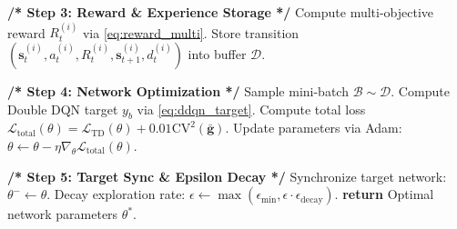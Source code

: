 \documentclass[journal]{IEEEtran}
\begin{document}
\begin{algorithm}[t]
\begin{algorithmic}[1]
        \STATE \textbf{/* Step 3: Reward \& Experience Storage */}
        \STATE Compute multi-objective reward $R_t^{(i)}$ via \eqref{eq:reward_multi}.
        \STATE Store transition $(\mathbf{s}_t^{(i)}, a_t^{(i)}, R_t^{(i)}, \mathbf{s}_{t+1}^{(i)}, d_t^{(i)})$ into buffer $\mathcal{D}$.
        
        \STATE \textbf{/* Step 4: Network Optimization */}
            \STATE Sample mini-batch $\mathcal{B} \sim \mathcal{D}$.
            \STATE Compute Double DQN target $y_b$ via \eqref{eq:ddqn_target}.
            \STATE Compute total loss $\mathcal{L}_{\text{total}}(\theta) = \mathcal{L}_{\text{TD}}(\theta) + 0.01 \text{CV}^2(\bar{\mathbf{g}})$.
            \STATE Update parameters via Adam: $\theta \leftarrow \theta - \eta \nabla_\theta \mathcal{L}_{\text{total}}(\theta)$.
        \ENDIF
        
        \STATE \textbf{/* Step 5: Target Sync \& Epsilon Decay */}
            \STATE Synchronize target network: $\theta^- \leftarrow \theta$.
        \ENDIF
        \STATE Decay exploration rate: $\epsilon \leftarrow \max(\epsilon_{\min}, \epsilon \cdot \epsilon_{\text{decay}})$.
    \ENDFOR
\ENDFOR
\STATE \textbf{return} Optimal network parameters $\theta^*$.
\end{algorithmic}
\end{algorithm}
\end{document}
